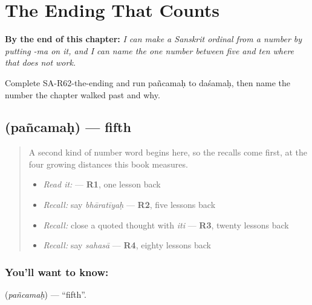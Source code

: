 
\chapter{The Ending That Counts}
\label{ch:sa-ordinals}

\begin{chapteropening}
\textbf{By the end of this chapter:} \emph{I can make a Sanskrit ordinal from a number by putting -ma on it, and I can name the one number between five and ten where that does not work.}

Complete SA-R62-the-ending and run pañcamaḥ to daśamaḥ, then name the number the chapter walked past and why.
\end{chapteropening}

\section[\texorpdfstring{\sk{पञ्चमः} (pañcamaḥ)}{पञ्चमः (pañcamaḥ)}]{ (pañcamaḥ) — fifth}

\label{lesson:SA-C62-fifth}



\begin{quote}
A second kind of number word begins here, so the recalls come first, at the four growing distances this book measures.

\begin{itemize}
\raggedright
  \item \emph{Read it:} \textbf{} — \textbf{R1}, one lesson back
  \item \emph{Recall:} say \emph{bhāratīyaḥ} — \textbf{R2}, five lessons back
  \item \emph{Recall:} close a quoted thought with \emph{iti} — \textbf{R3}, twenty lessons back
  \item \emph{Recall:} say \emph{sahasā} — \textbf{R4}, eighty lessons back
\end{itemize}
\end{quote}

\subsection*{You'll want to know: }
\textbf{} (\emph{pañcamaḥ}) — \textquotedblleft{}fifth\textquotedblright{}.

